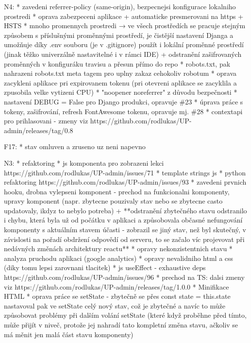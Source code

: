 N4:
* zavedeni referrer-policy (same-origin), bezpecnejsi konfigurace lokalniho prostredi
* oprava zabezpeceni aplikace + automaticke presmerovani na https + HSTS
* mnoho promennych prostredi → ve všech prostředích se pracuje stejným způsobem s příslušnými proměnnými prostředí, je čistější nastavení Djanga a umožňuje díky .env souboru (je v .gitignore) použít i lokální proměnné prostředí (jinak těžko univerzálně nastavitelné i v rámci IDE) + odstranění zašifrovaných proměnných v konfiguráku travisu a přesun přímo do repo
* robots.txt, pak nahrazeni robots.txt meta tagem pro uplny zakaz cehokoliv robotum
* oprava zacykleni aplikace pri expirovanem tokenu (pri otevreni aplikace se zacyklila a zpusobila velke vytizeni CPU)
* "noopener noreferrer" z důvodu bezpečnosti
* nastavení DEBUG = False pro Django produkci, opravuje \#23 
* úprava práce s tokeny, zašifrování, refresh FontAwesome tokenu, opravuje mj. \#28
* contextapi pro prihlasovani - zmeny viz https://github.com/rodlukas/UP-admin/releases/tag/0.8

F17:
* stav omluven a zruseno uz neni napevno

N3:
* refaktoring
* js komponenta pro zobrazeni lekci https://github.com/rodlukas/UP-admin/issues/71
* template strings js
* python refaktoring https://github.com/rodlukas/UP-admin/issues/93
* zavedeni prvnich hooku, drobna vylepseni komponent - prechod na funkcionalni komponenty, upravy komponent (napr. zbytecne pouzivaly stav nebo se zbytecne casto updatovaly, ikdyz to nebylo potreba) + **odstranění zbytečného stavu odstranilo i chybu, která byla už od počátku v aplikaci a způsobovala občasné nefungování komponenty s aktuálním stavem účasti - zobrazil se jiný stav, než byl skutečný, v závislosti na pořadí obdržení odpovědí od serveru, to se začalo víc projevovat při nedávných změnách architektury reactu**
* opravy nekonzistentnich stavu
* analyza pruchodu aplikaci (google analytics)
* opravy nevalidniho html a css (diky tomu lepsi zarovnani tlacitek)
*  js useEffect - exhaustive deps https://github.com/rodlukas/UP-admin/issues/96
* prechod na TS: dalsi zmeny viz https://github.com/rodlukas/UP-admin/releases/tag/1.0.0
* Minifikace HTML
* oprava práce se setState - zbytečně se přes const state = this.state nastavoval pak ve setState celý nový stav, což je zbytečné a navíc to může způsobovat problémy při dalším volání setState (které když proběhne před tímto, může přijít v niveč, protože jej nahradí tato kompletní změna stavu, ačkoliv se má měnit jen malá část stavu komponenty) 

